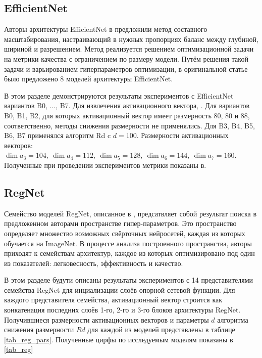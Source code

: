 \documentclass{article}
\begin{document}
\begin{large}
\subsection{EfficientNet}

Авторы архитектуры EfficientNet в \cite{efficient} предложили метод составного масштабирования, настраивающий в нужных пропорциях баланс между глубиной, шириной и разрешением. Метод реализуется решением оптимизационной задачи на метрики качества с ограничением по размеру модели. Путём решения такой задачи и варьированием гиперпараметров оптимизации, в оригинальной статье было предложено 8 моделей архитектуры EfficientNet.

В этом разделе демонстрируются результаты экспериментов с EfficientNet вариантов B0, ..., B7. Для извлечения активационного вектора, . Для вариантов B0, B1, B2, для которых активационный вектор имеет размерность 80, 80 и 88, соответственно, методы снижения размерности не применялись. Для B3, B4, B5, B6, B7 применялся алгоритм Rd c $d = 100$. Размерности активационных векторов: $\dim a_3 = 104,\ \dim a_4 = 112,\ \dim a_5 = 128,\ \dim a_6 = 144,\ \dim a_7 = 160$. Полученные при проведении экспериментов метрики показаны в.

\subsection{RegNet}

Семейство моделей RegNet, описанное в \cite{regnet}, предсатвляет собой результат поиска в предложенном авторами пространстве гипер-параметров. Это пространство определяет множество возможных свёрточных нейросетей, каждая из которых обучается на ImageNet. В процессе анализа построенного пространства, авторы \cite{regnet} приходят к семействам архитектур, каждое из которых оптимизировано под один из показателей: легковесность, эффективность и качество.

В этом разделе будути описаны результаты экспериментов с 14 представителями семейства RegNet для инциализации слоёв опорной сетевой функции. Для каждого представителя семейства, активационный вектор строится как конкатенация последних слоёв 1-го, 2-го и 3-го блоков архитектуры RegNet. Получившиеся размерности активационных векторов и параметры $d$ алгоритма снижения размерности $Rd$ для каждой из моделей представлены в таблице \ref{tab_reg_pars}. Полученные цирфы по исследуемым моделям показаны в \ref{tab_reg}


\end{large}
\end{document}
